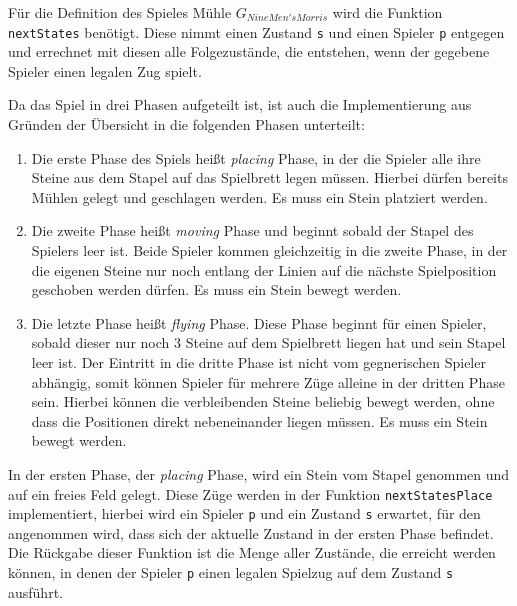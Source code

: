 \documentclass[11pt]{article}
\providecommand{\tightlist}{%
      \setlength{\itemsep}{0pt}\setlength{\parskip}{0pt}}
\begin{document}
Für die Definition des Spieles Mühle \(G_{Nine Men's Morris}\) wird die
Funktion \texttt{nextStates} benötigt. Diese nimmt einen Zustand
\texttt{s} und einen Spieler \texttt{p} entgegen und errechnet mit
diesen alle Folgezustände, die entstehen, wenn der gegebene Spieler
einen legalen Zug spielt.

Da das Spiel in drei Phasen aufgeteilt ist, ist auch die Implementierung
aus Gründen der Übersicht in die folgenden Phasen unterteilt:

\begin{enumerate}
\def\labelenumi{\arabic{enumi}.}
\tightlist
\item
  Die erste Phase des Spiels heißt \emph{placing} Phase, in der die
  Spieler alle ihre Steine aus dem Stapel auf das Spielbrett legen
  müssen. Hierbei dürfen bereits Mühlen gelegt und geschlagen werden. Es
  muss ein Stein platziert werden.
\item
  Die zweite Phase heißt \emph{moving} Phase und beginnt sobald der
  Stapel des Spielers leer ist. Beide Spieler kommen gleichzeitig in die
  zweite Phase, in der die eigenen Steine nur noch entlang der Linien
  auf die nächste Spielposition geschoben werden dürfen. Es muss ein
  Stein bewegt werden.
\item
  Die letzte Phase heißt \emph{flying} Phase. Diese Phase beginnt für
  einen Spieler, sobald dieser nur noch \(3\) Steine auf dem Spielbrett
  liegen hat und sein Stapel leer ist. Der Eintritt in die dritte Phase
  ist nicht vom gegnerischen Spieler abhängig, somit können Spieler für
  mehrere Züge alleine in der dritten Phase sein. Hierbei können die
  verbleibenden Steine beliebig bewegt werden, ohne dass die Positionen
  direkt nebeneinander liegen müssen. Es muss ein Stein bewegt werden.
\end{enumerate}

In der ersten Phase, der \emph{placing} Phase, wird ein Stein vom Stapel
genommen und auf ein freies Feld gelegt. Diese Züge werden in der
Funktion \texttt{nextStatesPlace} implementiert, hierbei wird ein
Spieler \texttt{p} und ein Zustand \texttt{s} erwartet, für den
angenommen wird, dass sich der aktuelle Zustand in der ersten Phase
befindet. Die Rückgabe dieser Funktion ist die Menge aller Zustände, die
erreicht werden können, in denen der Spieler \texttt{p} einen legalen
Spielzug auf dem Zustand \texttt{s} ausführt.
\end{document}
